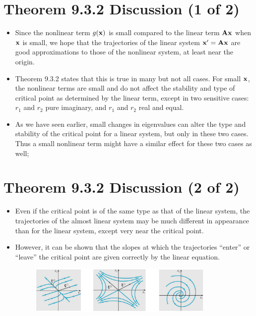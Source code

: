 \documentclass[11pt,a4paper]{article}
\begin{document}
	\section*{Theorem 9.3.2 Discussion (1 of 2)}
	\begin{itemize}
		\item Since the nonlinear term $g(\vb{x})$ is small compared to the linear term $\vb{Ax}$ when $\vb{x}$ is small, we hope that the trajectories of the linear system $\vb{x}^\prime = \vb{Ax}$ are good approximations to those of the nonlinear system, at least near the origin.
		\item Theorem 9.3.2 states that this is true in many but not all cases. For small $\vb{x}$, the nonlinear terms are small and do not affect the stability and type of critical point as determined by the linear term, except in two sensitive cases: $r_1$ and $r_2$ pure imaginary, and $r_1$ and $r_2$ real and equal.
		\item As we have seen earlier, small changes in eigenvalues can alter the type and stability of the critical point for a linear system, but only in these two cases. Thus a small nonlinear term might have a similar effect for these two cases as well;
	\end{itemize}
	\section*{Theorem 9.3.2 Discussion (2 of 2)}
	\begin{itemize}
		\item Even if the critical point is of the same type as that of the linear system, the trajectories of the almost linear system may be much different in appearance than for the linear system, except very near the critical point.
		\item However, it can be shown that the slopes at which the trajectories “enter” or “leave” the critical point are given correctly by the linear equation.
		\begin{figure}[H]
			\centering
				\includegraphics[width=0.85\textwidth]{figure/Lec16f4.PNG}
		\end{figure}
	\end{itemize}
\end{document}
